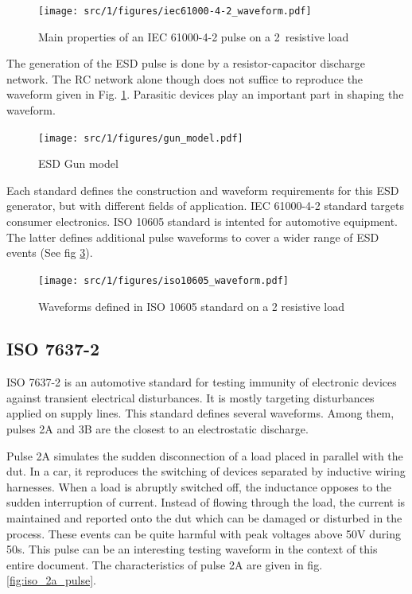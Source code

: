 \begin{figure}[!h]
  \centering
  \texttt{[image: src/1/figures/iec61000-4-2\_waveform.pdf]}
  \caption{Main properties of an IEC 61000-4-2 pulse on a 2\textOmega\ resistive load}
  \label{iec_pulse}
\end{figure}

The generation of the ESD pulse is done by a resistor-capacitor discharge network.
The RC network alone though does not suffice to reproduce the waveform given in Fig. \ref{iec_pulse}.
Parasitic devices play an important part in shaping the waveform.

\begin{figure}[!h]
  \centering
  \texttt{[image: src/1/figures/gun\_model.pdf]}
  \caption{ESD Gun model}
  \label{fig:ed-gun-model}
\end{figure}

Each standard defines the construction and waveform requirements for this ESD generator, but with different fields of application.
IEC 61000-4-2\cite{iec61000-4-2} standard targets consumer electronics.
ISO 10605\cite{iso10605} standard is intented for automotive equipment.
The latter defines additional pulse waveforms to cover a wider range of ESD events (See fig \ref{iso_pulse}).

\begin{figure}[!h]
  \centering
  \texttt{[image: src/1/figures/iso10605\_waveform.pdf]}
  \caption{Waveforms defined in ISO 10605 standard on a 2\textOmega{} resistive load}
  \label{iso_pulse}
\end{figure}


\subsection{ISO 7637-2}

ISO 7637-2\cite{iso7637-2} is an automotive standard for testing immunity of electronic devices against transient electrical disturbances.
It is mostly targeting disturbances applied on supply lines.
This standard defines several waveforms.
Among them, pulses 2A and 3B are the closest to an electrostatic discharge.

Pulse 2A simulates the sudden disconnection of a load placed in parallel with the \gls{dut}.
In a car, it reproduces the switching of devices separated by inductive wiring harnesses.
When a load is abruptly switched off, the inductance opposes to the sudden interruption of current.
Instead of flowing through the load, the current is maintained and reported onto the \gls{dut} which can be damaged or disturbed in the process.
These events can be quite harmful with peak voltages above 50V during 50\textmu{}s.
This pulse can be an interesting testing waveform in the context of this entire document.
The characteristics of pulse 2A are given in fig. \ref{fig:iso_2a_pulse}.

